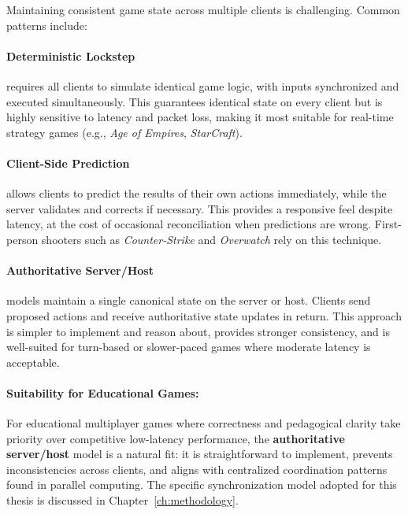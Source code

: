 Maintaining consistent game state across multiple clients is challenging. Common patterns include:

\paragraph*{Deterministic Lockstep}
requires all clients to simulate identical game logic, with inputs synchronized and executed simultaneously. This guarantees identical state on every client but is highly sensitive to latency and packet loss, making it most suitable for real-time strategy games (e.g., \textit{Age of Empires}, \textit{StarCraft}).

\paragraph*{Client-Side Prediction}
allows clients to predict the results of their own actions immediately, while the server validates and corrects if necessary. This provides a responsive feel despite latency, at the cost of occasional reconciliation when predictions are wrong. First-person shooters such as \textit{Counter-Strike} and \textit{Overwatch} rely on this technique.

\paragraph*{Authoritative Server/Host}
models maintain a single canonical state on the server or host. Clients send proposed actions and receive authoritative state updates in return. This approach is simpler to implement and reason about, provides stronger consistency, and is well-suited for turn-based or slower-paced games where moderate latency is acceptable.

\paragraph*{Suitability for Educational Games:}

For educational multiplayer games where correctness and pedagogical clarity take priority over competitive low-latency performance, the \textbf{authoritative server/host} model is a natural fit: it is straightforward to implement, prevents inconsistencies across clients, and aligns with centralized coordination patterns found in parallel computing. The specific synchronization model adopted for this thesis is discussed in Chapter~\ref{ch:methodology}.

